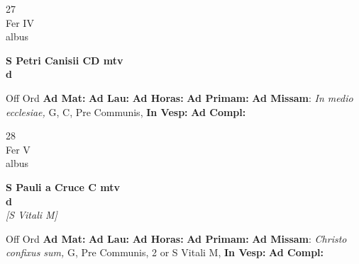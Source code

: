 \documentclass[10pt, openany]{book}
\begin{document}
    \begin{center}
        \begin{minipage}{3.5in}
            \vspace{2em}
            \begin{minipage}{0.5in}
                {\Huge 27} \\
                {\normalsize Fer IV} \\
                {\normalsize albus}
            \end{minipage}
            \begin{minipage}{3.0in}
                \textbf{ \large S Petri Canisii CD mtv \\
                \textnormal{\normalsize d}} \\ 
            \end{minipage}
            \begin{justify}Off Ord
                \textbf{Ad Mat: }
                \textbf{Ad Lau: }
                \textbf{Ad Horas: }
                \textbf{Ad Primam: }\textbf{Ad Missam}: \textit{In medio ecclesiae,} G, C, Pre Communis,  
                \textbf{In Vesp: }
                \textbf{Ad Compl: }
            \end{justify}
        \end{minipage}
    \end{center}

    \begin{center}
        \begin{minipage}{3.5in}
            \vspace{2em}
            \begin{minipage}{0.5in}
                {\Huge 28} \\
                {\normalsize Fer V} \\
                {\normalsize albus}
            \end{minipage}
            \begin{minipage}{3.0in}
                \textbf{ \large S Pauli a Cruce C mtv \\
                \textnormal{\normalsize d}} \\ \textit{[S Vitali M]} \\ 
            \end{minipage}
            \begin{justify}Off Ord
                \textbf{Ad Mat: }
                \textbf{Ad Lau: }
                \textbf{Ad Horas: }
                \textbf{Ad Primam: }\textbf{Ad Missam}: \textit{Christo confixus sum,} G, Pre Communis, 2 or S Vitali M,  
                \textbf{In Vesp: }
                \textbf{Ad Compl: }
            \end{justify}
        \end{minipage}
    \end{center}
\end{document}
